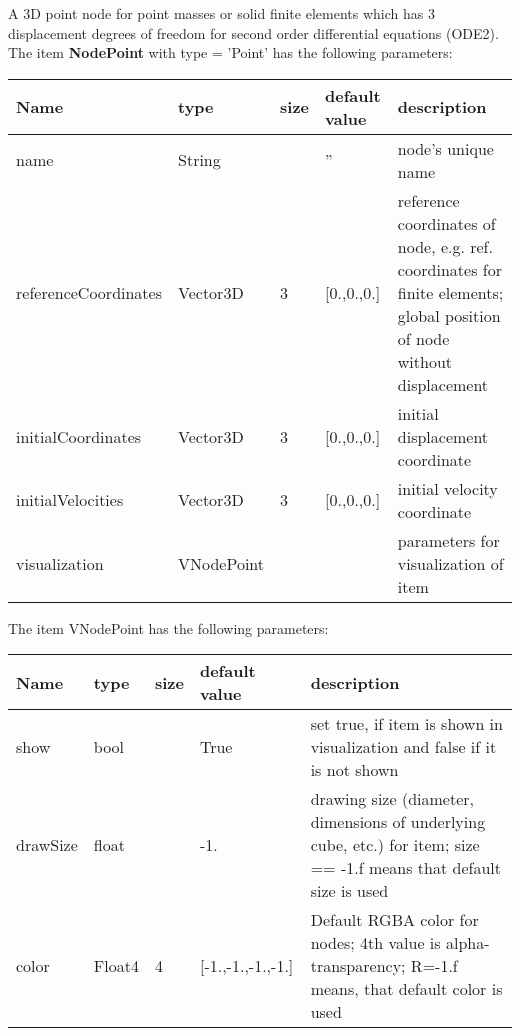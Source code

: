 
\newpage

A 3D point node for point masses or solid finite elements which has 3 displacement degrees of freedom for second order differential equations (ODE2).
 \\\vspace{12pt} \noindent The item {\bf NodePoint} with type = 'Point' has the following parameters:\vspace{-1cm}\\ 
\begin{center}
  \footnotesize
  \begin{longtable}{| p{4.5cm} | p{2.5cm} | p{0.5cm} | p{2.5cm} | p{6cm} |}
    \hline
    \bf Name & \bf type & \bf size & \bf default value & \bf description \\ \hline
    name &     String &      &     '' &     node's unique name\\ \hline
    referenceCoordinates &     Vector3D &     3 &     [0.,0.,0.] &     reference coordinates of node, e.g. ref. coordinates for finite elements; global position of node without displacement\\ \hline
    initialCoordinates &     Vector3D &     3 &     [0.,0.,0.] &     initial displacement coordinate\\ \hline
    initialVelocities &     Vector3D &     3 &     [0.,0.,0.] &     initial velocity coordinate\\ \hline
    visualization & VNodePoint & & & parameters for visualization of item \\ \hline
	  \end{longtable}
	\end{center}
The item VNodePoint has the following parameters:\vspace{-1cm}\\ 
\begin{center}
  \footnotesize
  \begin{longtable}{| p{4.5cm} | p{2.5cm} | p{0.5cm} | p{2.5cm} | p{6cm} |}
    \hline
    \bf Name & \bf type & \bf size & \bf default value & \bf description \\ \hline
    show &     bool &      &     True &     set true, if item is shown in visualization and false if it is not shown\\ \hline
    drawSize &     float &      &     -1. &     drawing size (diameter, dimensions of underlying cube, etc.)  for item; size == -1.f means that default size is used\\ \hline
    color &     Float4 &     4 &     [-1.,-1.,-1.,-1.] &     Default RGBA color for nodes; 4th value is alpha-transparency; R=-1.f means, that default color is used\\ \hline
	  \end{longtable}
	\end{center}

